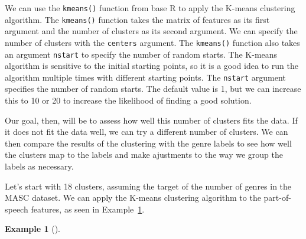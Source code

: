 \documentclass[
  letterpaper,
  DIV=11,
  numbers=noendperiod]{scrreport}
\newenvironment{Shaded}{\begin{snugshade}}{\end{snugshade}}
\newcommand{\AttributeTok}[1]{\textcolor[rgb]{0.00,0.00,0.00}{#1}}
\newcommand{\CommentTok}[1]{\textcolor[rgb]{0.00,0.00,0.00}{\textit{#1}}}
\newcommand{\DecValTok}[1]{\textcolor[rgb]{0.00,0.00,0.00}{#1}}
\newcommand{\FunctionTok}[1]{\textcolor[rgb]{0.00,0.00,0.00}{#1}}
\newcommand{\NormalTok}[1]{\textcolor[rgb]{0.00,0.00,0.00}{#1}}
\newcommand{\OtherTok}[1]{\textcolor[rgb]{0.00,0.00,0.00}{#1}}
\newcommand{\SpecialCharTok}[1]{\textcolor[rgb]{0.00,0.00,0.00}{#1}}
\theoremstyle{definition}
\newtheorem{example}{Example}[chapter]
\theoremstyle{remark}
\begin{document}
We can use the \texttt{kmeans()} function from base R to apply the
K-means clustering algorithm. The \texttt{kmeans()} function takes the
matrix of features as its first argument and the number of clusters as
its second argument. We can specify the number of clusters with the
\texttt{centers} argument. The \texttt{kmeans()} function also takes an
argument \texttt{nstart} to specify the number of random starts. The
K-means algorithm is sensitive to the initial starting points, so it is
a good idea to run the algorithm multiple times with different starting
points. The \texttt{nstart} argument specifies the number of random
starts. The default value is 1, but we can increase this to 10 or 20 to
increase the likelihood of finding a good solution.

Our goal, then, will be to assess how well this number of clusters fits
the data. If it does not fit the data well, we can try a different
number of clusters. We can then compare the results of the clustering
with the genre labels to see how well the clusters map to the labels and
make ajustments to the way we group the labels as necessary.

Let's start with 18 clusters, assuming the target of the number of
genres in the MASC dataset. We can apply the K-means clustering
algorithm to the part-of-speech features, as seen in
Example~\ref{exm-eda-masc-pos-kmeans}.

\begin{example}[]\protect\hypertarget{exm-eda-masc-pos-kmeans}{}\label{exm-eda-masc-pos-kmeans}

~

\begin{Shaded}
\end{Shaded}

\end{example}
\end{document}
